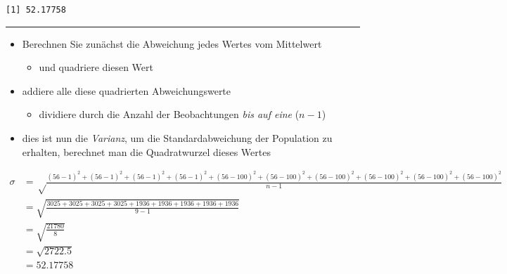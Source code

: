 \documentclass[
  letterpaper,
  DIV=11]{scrartcl}
\providecommand{\tightlist}{%
  \setlength{\itemsep}{0pt}\setlength{\parskip}{0pt}}\usepackage{longtable,booktabs,array}
\begin{document}
\begin{verbatim}
[1] 52.17758
\end{verbatim}

\begin{center}\rule{0.5\linewidth}{0.5pt}\end{center}

\begin{tcolorbox}[enhanced jigsaw, breakable, colbacktitle=quarto-callout-note-color!10!white, toptitle=1mm, bottomrule=.15mm, rightrule=.15mm, coltitle=black, toprule=.15mm, opacityback=0, leftrule=.75mm, left=2mm, colframe=quarto-callout-note-color-frame, bottomtitle=1mm, titlerule=0mm, title=\textcolor{quarto-callout-note-color}{\faInfo}\hspace{0.5em}{CBerechnung der Standardabweichung}, arc=.35mm, colback=white, opacitybacktitle=0.6]

\begin{itemize}
\tightlist
\item
  Berechnen Sie zunächst die Abweichung jedes Wertes vom Mittelwert

  \begin{itemize}
  \tightlist
  \item
    und quadriere diesen Wert
  \end{itemize}
\item
  addiere alle diese quadrierten Abweichungswerte

  \begin{itemize}
  \tightlist
  \item
    dividiere durch die Anzahl der Beobachtungen \emph{bis auf eine}
    (\(n-1\))
  \end{itemize}
\item
  dies ist nun die \emph{Varianz}, um die Standardabweichung der
  Population zu erhalten, berechnet man die Quadratwurzel dieses Wertes
\end{itemize}

\begin{align}

\sigma & = \sqrt\frac{(56-1)^2 + (56-1)^2 + (56-1)^2 + (56-1)^2 + (56-100)^2 +
        (56-100)^2 + (56-100)^2 + (56-100)^2 + (56-100)^2 + (56-100)^2}{n-1}
\\
& = \sqrt{\frac{3025 + 3025 + 3025 + 3025 + 1936 + 1936 + 1936 + 1936 + 1936}{9-1}}
\\
& = \sqrt{\frac{21780}{8}}
\\
& = \sqrt{2722.5}
\\
& = 52.17758


\end{align}
\end{tcolorbox}
\end{document}
